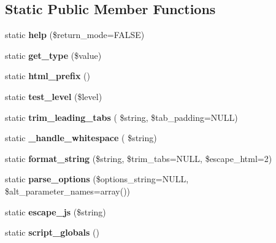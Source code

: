 \subsection*{Static Public Member Functions}
\begin{DoxyCompactItemize}
\item 
\mbox{\label{class_dbug_l_a88c15ce9c2420dbe752efa546669b84e}} 
static {\bfseries help} (\$return\+\_\+mode=F\+A\+L\+SE)
\item 
\mbox{\label{class_dbug_l_a4819d3a1c3b36e520cf801d8397fb3ec}} 
static {\bfseries get\+\_\+type} (\$value)
\item 
\mbox{\label{class_dbug_l_a4c9298c3172427d7bc48994b27c921d5}} 
static {\bfseries html\+\_\+prefix} ()
\item 
\mbox{\label{class_dbug_l_a0f251fc06b9095331952439f4c3819a2}} 
static {\bfseries test\+\_\+level} (\$level)
\item 
\mbox{\label{class_dbug_l_ab8f150beb454f23fed7204f944a6d134}} 
static {\bfseries trim\+\_\+leading\+\_\+tabs} ( \$string, \$tab\+\_\+padding=N\+U\+LL)
\item 
\mbox{\label{class_dbug_l_a20c16e3deec26ba6be22a969ae1df10d}} 
static {\bfseries \+\_\+handle\+\_\+whitespace} ( \$string)
\item 
\mbox{\label{class_dbug_l_affee7edb640cab947fb7e34dafb2e593}} 
static {\bfseries format\+\_\+string} (\$string, \$trim\+\_\+tabs=N\+U\+LL, \$escape\+\_\+html=2)
\item 
\mbox{\label{class_dbug_l_a4d000b2c863d7c9c384ecaa7f5249f62}} 
static {\bfseries parse\+\_\+options} (\$options\+\_\+string=N\+U\+LL, \$alt\+\_\+parameter\+\_\+names=array())
\item 
\mbox{\label{class_dbug_l_a78bbbd22db141177702aafe36e5a6c4f}} 
static {\bfseries escape\+\_\+js} (\$string)
\item 
\mbox{\label{class_dbug_l_ae93bc61c2c69d06c6ac7e16c9f5017ee}} 
static {\bfseries script\+\_\+globals} ()
\end{DoxyCompactItemize}
